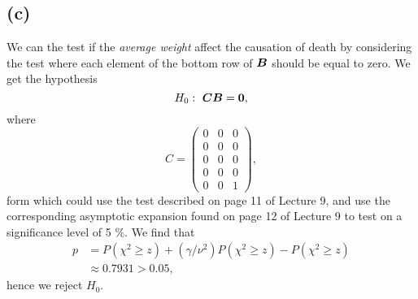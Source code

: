 \subsection*{(c)}
\label{sec:c-5}

We can the test if the \textit{average weight} affect the causation of
death by considering the test where each element of the bottom row of $\bm{B}$ should be equal to zero. We get the hypothesis
\begin{equation*}
  H_0:\ \bm{CB} = \bm{0},
\end{equation*}
where 
\begin{equation*}
  C = 
  \begin{pmatrix}
    0 &0 &0 \\ 
    0 &0 &0 \\ 
    0 &0 &0 \\ 
    0 &0 &0 \\ 
    0 &0 &1   
  \end{pmatrix},
\end{equation*}
form which could use the test described on page 11 of Lecture 9, and use
the corresponding asymptotic expansion found on page 12 of Lecture 9 to
test on a significance level of 5 \%. We find that 
\begin{align*}
  p &= P(\chi^2 \geq z) + (\gamma/\nu^2)P(\chi^2 \geq z) -  P(\chi^2
      \geq z )\\
    &\approx 0.7931 > 0.05,
\end{align*}
hence we reject $H_0$.
